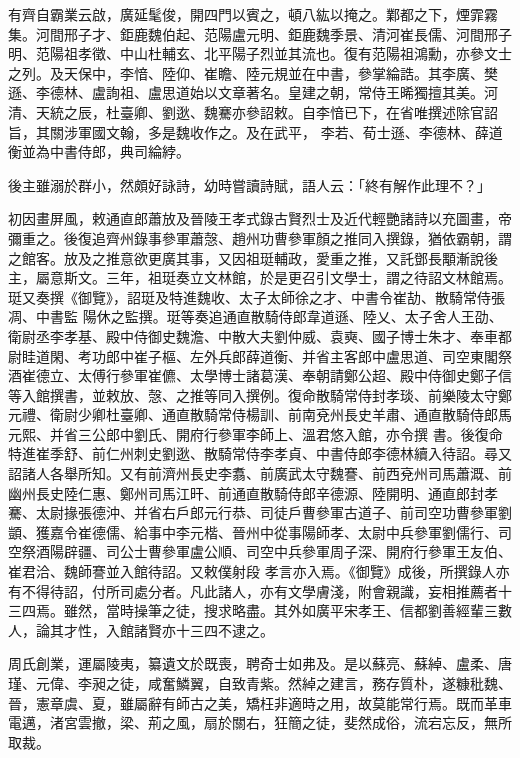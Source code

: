 \begin{pinyinscope}
 有齊自霸業云啟，廣延髦俊，開四門以賓之，頓八紘以掩之。鄴都之下，煙霏霧集。河間邢子才、鉅鹿魏伯起、范陽盧元明、鉅鹿魏季景、清河崔長儒、河間邢子明、范陽祖孝徵、中山杜輔玄、北平陽子烈並其流也。復有范陽祖鴻勳，亦參文士之列。及天保中，李愔、陸仰、崔瞻、陸元規並在中書，參掌綸誥。其李廣、樊遜、李德林、盧詢祖、盧思道始以文章著名。皇建之朝，常侍王晞獨擅其美。河清、天統之辰，杜臺卿、劉逖、魏騫亦參詔敕。自李愔已下，在省唯撰述除官詔旨，其關涉軍國文翰，多是魏收作之。及在武平，
 李若、荀士遜、李德林、薛道衡並為中書侍郎，典司綸綍。



 後主雖溺於群小，然頗好詠詩，幼時嘗讀詩賦，語人云：「終有解作此理不？」



 初因畫屏風，敕通直郎蕭放及晉陵王孝式錄古賢烈士及近代輕艷諸詩以充圖畫，帝彌重之。後復追齊州錄事參軍蕭愨、趙州功曹參軍顏之推同入撰錄，猶依霸朝，謂之館客。放及之推意欲更廣其事，又因祖珽輔政，愛重之推，又託鄧長顒漸說後主，屬意斯文。三年，祖珽奏立文林館，於是更召引文學士，謂之待詔文林館焉。珽又奏撰《御覽》，詔珽及特進魏收、太子太師徐之才、中書令崔劼、散騎常侍張凋、中書監
 陽休之監撰。珽等奏追通直散騎侍郎韋道遜、陸乂、太子舍人王劭、衛尉丞李孝基、殿中侍御史魏澹、中散大夫劉仲威、袁奭、國子博士朱才、奉車都尉眭道閑、考功郎中崔子樞、左外兵郎薛道衡、并省主客郎中盧思道、司空東閣祭酒崔德立、太傅行參軍崔儦、太學博士諸葛漢、奉朝請鄭公超、殿中侍御史鄭子信等入館撰書，並敕放、愨、之推等同入撰例。復命散騎常侍封孝琰、前樂陵太守鄭元禮、衛尉少卿杜臺卿、通直散騎常侍楊訓、前南兗州長史羊肅、通直散騎侍郎馬元熙、并省三公郎中劉氏、開府行參軍李師上、溫君悠入館，亦令撰
 書。後復命特進崔季舒、前仁州刺史劉逖、散騎常侍李孝貞、中書侍郎李德林續入待詔。尋又詔諸人各舉所知。又有前濟州長史李翥、前廣武太守魏謇、前西兗州司馬蕭溉、前幽州長史陸仁惠、鄭州司馬江旰、前通直散騎侍郎辛德源、陸開明、通直郎封孝騫、太尉掾張德沖、并省右戶郎元行恭、司徒戶曹參軍古道子、前司空功曹參軍劉顗、獲嘉令崔德儒、給事中李元楷、晉州中從事陽師孝、太尉中兵參軍劉儒行、司空祭酒陽辟疆、司公士曹參軍盧公順、司空中兵參軍周子深、開府行參軍王友伯、崔君洽、魏師謇並入館待詔。又敕僕射段
 孝言亦入焉。《御覽》成後，所撰錄人亦有不得待詔，付所司處分者。凡此諸人，亦有文學膚淺，附會親識，妄相推薦者十三四焉。雖然，當時操筆之徒，搜求略盡。其外如廣平宋孝王、信都劉善經輩三數人，論其才性，入館諸賢亦十三四不逮之。



 周氏創業，運屬陵夷，纂遺文於既喪，聘奇士如弗及。是以蘇亮、蘇綽、盧柔、唐瑾、元偉、李昶之徒，咸奮鱗翼，自致青紫。然綽之建言，務存質朴，遂糠秕魏、晉，憲章虞、夏，雖屬辭有師古之美，矯枉非適時之用，故莫能常行焉。既而革車電邁，渚宮雲撤，梁、荊之風，扇於關右，狂簡之徒，斐然成俗，流宕忘反，無所取裁。




\end{pinyinscope}
